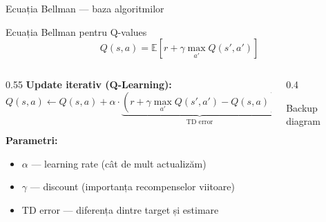 \documentclass[aspectratio=169]{beamer}
\begin{document}
\begin{frame}{Ecuația Bellman — baza algoritmilor}
  \begin{block}{Ecuația Bellman pentru Q-values}
    \[Q(s,a) = \mathbb{E}\left[r + \gamma \max_{a'} Q(s', a')\right]\]
  \end{block}
  
  \begin{columns}
    \begin{column}{0.55\textwidth}
      \textbf{Update iterativ (Q-Learning):}
      \[Q(s,a) \leftarrow Q(s,a) + \alpha \cdot \underbrace{(r + \gamma \max_{a'} Q(s',a') - Q(s,a))}_{\text{TD error}}\]
      
      \vspace{0.2cm}
      \textbf{Parametri:}
      \begin{itemize}
        \item $\alpha$ — learning rate (cât de mult actualizăm)
        \item $\gamma$ — discount (importanța recompenselor viitoare)
        \item TD error — diferența dintre target și estimare
      \end{itemize}
    \end{column}
    \begin{column}{0.4\textwidth}
      \centering
      
      {\footnotesize Backup diagram}
    \end{column}
  \end{columns}
\end{frame}
\end{document}
